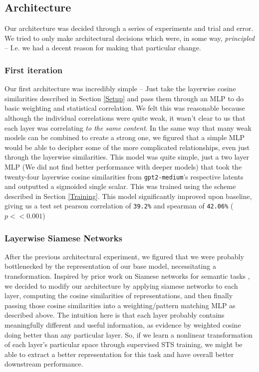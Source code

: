 \documentclass{article}
\begin{document}
\subsection{Architecture} \label{Architecture}
Our architecture was decided through a series of experiments and trial and error. We tried to only make architectural decisions which were, in some way, \textit{principled} -- I.e. we had a decent reason for making that particular change.

\subsubsection{First iteration}
Our first architecture was incredibly simple -- Just take the layerwise cosine similarities described in Section \ref {Setup} and pass them through an MLP to do basic weighting and statistical correlation. We felt this was reasonable because although the individual correlations were quite weak, it wasn't clear to us that each layer was correlating \textit{to the same content}. In the same way that many weak models can be combined to create a strong one, we figured that a simple MLP would be able to decipher some of the more complicated relationships, even just through the layerwise similarities. This model was quite simple, just a two layer MLP (We did not find better performance with deeper models) that took the twenty-four layerwise cosine similarities from \verb|gpt2-medium|'s respective latents and outputted a sigmoided single scalar. This was trained using the scheme described in Section \ref{Training}. This model significantly improved upon baseline, giving us a test set pearson correlation of \verb|39.2%| and spearman of \verb|42.06%| ($p<< 0.001$)

\subsubsection{Layerwise Siamese Networks}
After the previous architectural experiment, we figured that we were probably bottlenecked by the representation of our base model, necessitating a transformation. Inspired by prior work on Siamese networks for semantic tasks \cite{reimers2019sentencebertsentenceembeddingsusing}, we decided to modify our architecture by applying siamese networks to each layer, computing the cosine similarities of  representations, and then finally passing those cosine similarities into a weighting/pattern matching MLP as described above. The intuition here is that each layer probably contains meaningfully different and useful information, as evidence by weighted cosine doing better than any particular layer. So, if we learn a nonlinear transformation of each layer's particular space through supervised STS training, we might be able to extract a better representation for this task and have overall better downstream performance.
\end{document}
